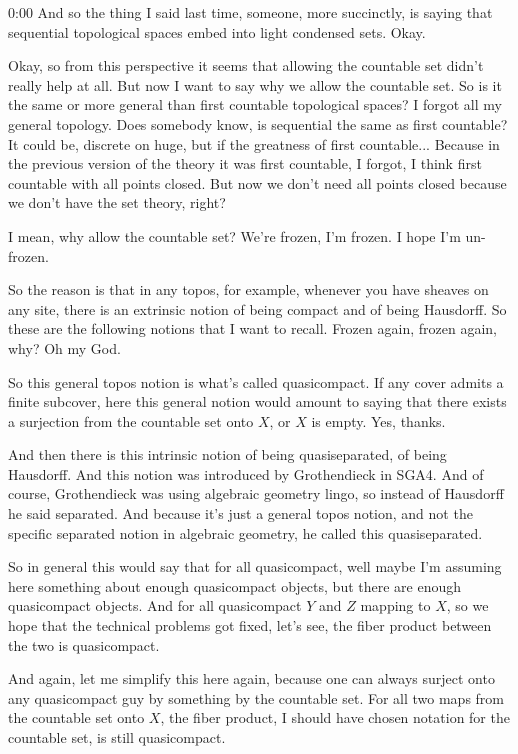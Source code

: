 \begin{unfinished}{0:00}
And so the thing I said last time, someone, more succinctly, is saying that sequential topological spaces embed into light condensed sets. Okay.

Okay, so from this perspective it seems that allowing the countable set didn't really help at all. But now I want to say why we allow the countable set. So is it the same or more general than first countable topological spaces? I forgot all my general topology. Does somebody know, is sequential the same as first countable? It could be, discrete on huge, but if the greatness of first countable... Because in the previous version of the theory it was first countable, I forgot, I think first countable with all points closed. But now we don't need all points closed because we don't have the set theory, right?

I mean, why allow the countable set? We're frozen, I'm frozen. I hope I'm un-frozen.

So the reason is that in any topos, for example, whenever you have sheaves on any site, there is an extrinsic notion of being compact and of being Hausdorff. So these are the following notions that I want to recall. Frozen again, frozen again, why? Oh my God.

So this general topos notion is what's called quasicompact. If any cover admits a finite subcover, here this general notion would amount to saying that there exists a surjection from the countable set onto $X$, or $X$ is empty. Yes, thanks.

And then there is this intrinsic notion of being quasiseparated, of being Hausdorff. And this notion was introduced by Grothendieck in SGA4. And of course, Grothendieck was using algebraic geometry lingo, so instead of Hausdorff he said separated. And because it's just a general topos notion, and not the specific separated notion in algebraic geometry, he called this quasiseparated.

So in general this would say that for all quasicompact, well maybe I'm assuming here something about enough quasicompact objects, but there are enough quasicompact objects. And for all quasicompact $Y$ and $Z$ mapping to $X$, so we hope that the technical problems got fixed, let's see, the fiber product between the two is quasicompact.

And again, let me simplify this here again, because one can always surject onto any quasicompact guy by something by the countable set. For all two maps from the countable set onto $X$, the fiber product, I should have chosen notation for the countable set, is still quasicompact.


\end{unfinished}

